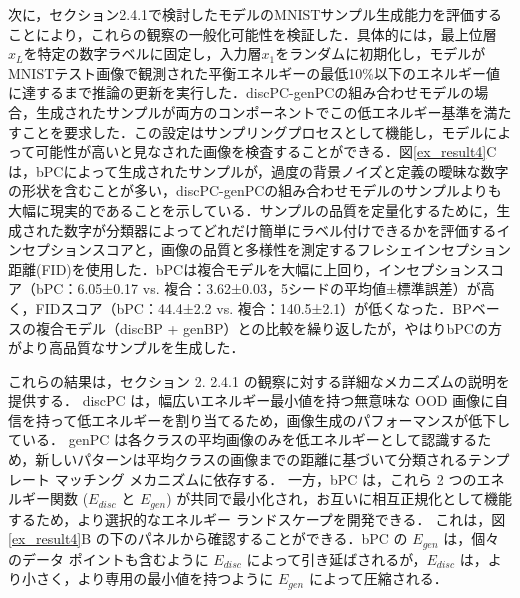 \documentclass[a4paper, titlepage]{jsarticle}
\begin{document}
\par
次に，セクション2.4.1で検討したモデルのMNISTサンプル生成能力を評価することにより，これらの観察の一般化可能性を検証した．具体的には，最上位層$x_L$を特定の数字ラベルに固定し，入力層$x_1$をランダムに初期化し，モデルがMNISTテスト画像で観測された平衡エネルギーの最低10\%以下のエネルギー値に達するまで推論の更新を実行した．discPC-genPCの組み合わせモデルの場合，生成されたサンプルが両方のコンポーネントでこの低エネルギー基準を満たすことを要求した．この設定はサンプリングプロセスとして機能し，モデルによって可能性が高いと見なされた画像を検査することができる．図\ref{ex_result4}Cは，bPCによって生成されたサンプルが，過度の背景ノイズと定義の曖昧な数字の形状を含むことが多い，discPC-genPCの組み合わせモデルのサンプルよりも大幅に現実的であることを示している．サンプルの品質を定量化するために，生成された数字が分類器によってどれだけ簡単にラベル付けできるかを評価するインセプションスコアと，画像の品質と多様性を測定するフレシェインセプション距離(FID)を使用した．bPCは複合モデルを大幅に上回り，インセプションスコア（bPC：6.05±0.17 vs. 複合：3.62±0.03，5シードの平均値±標準誤差）が高く，FIDスコア（bPC：44.4±2.2 vs. 複合：140.5±2.1）が低くなった．BPベースの複合モデル（discBP + genBP）との比較を繰り返したが，やはりbPCの方がより高品質なサンプルを生成した．
\par
これらの結果は，セクション 2.
2.4.1 の観察に対する詳細なメカニズムの説明を提供する． discPC は，幅広いエネルギー最小値を持つ無意味な OOD 画像に自信を持って低エネルギーを割り当てるため，画像生成のパフォーマンスが低下している． genPC は各クラスの平均画像のみを低エネルギーとして認識するため，新しいパターンは平均クラスの画像までの距離に基づいて分類されるテンプレート マッチング メカニズムに依存する． 一方，bPC は，これら 2 つのエネルギー関数 ($E_{disc}$ と $E_{gen}$) が共同で最小化され，お互いに相互正規化として機能するため，より選択的なエネルギー ランドスケープを開発できる． これは，図\ref{ex_result4}B の下のパネルから確認することができる．bPC の $E_{gen}$ は，個々のデータ ポイントも含むように $E_{disc}$ によって引き延ばされるが，$E_{disc}$ は，より小さく，より専用の最小値を持つように $E_{gen}$ によって圧縮される．
\end{document}
